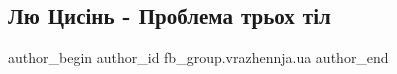  
 
 
 
 
 
\subsection{Лю Цисінь - Проблема трьох тіл}
\label{sec:17_08_2022.fb.fb_group.vrazhennja.ua.1.problema_trjoh_til}
 
\ifcmt
 author_begin
   author_id fb_group.vrazhennja.ua
 author_end
\fi
